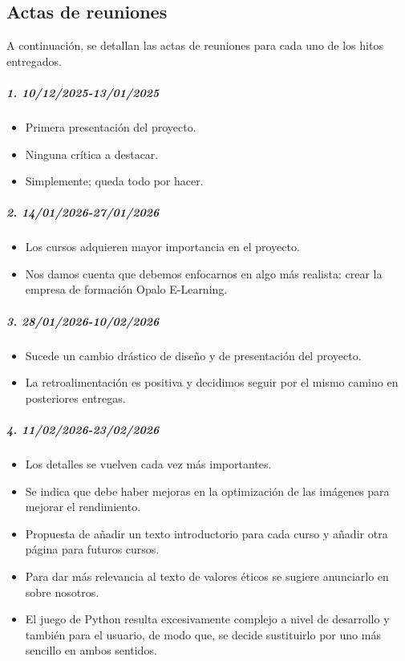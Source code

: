 \documentclass[11.5pt]{article}
\begin{document}
	
	
	\subsection{Actas de reuniones}
	
	A continuación, se detallan las actas de reuniones para cada uno de los hitos entregados.
	
	\subparagraph*{1. 10/12/2025-13/01/2025}
	
	\begin{itemize}
		\item Primera presentación del proyecto.
		\item Ninguna crítica a destacar.
		\item Simplemente; queda todo por hacer.
	\end{itemize}

	\subparagraph*{2. 14/01/2026-27/01/2026}
	
	\begin{itemize}
		\item Los cursos adquieren mayor importancia en el proyecto.
		\item Nos damos cuenta que debemos enfocarnos en algo más realista: crear la empresa de formación Opalo E-Learning.
	\end{itemize}
	
	\subparagraph*{3. 28/01/2026-10/02/2026}
	
	\begin{itemize}
		\item Sucede un cambio drástico de diseño y de presentación del proyecto.
		\item La retroalimentación es positiva y decidimos seguir por el mismo camino en posteriores entregas.
	\end{itemize}
	
	\subparagraph*{4. 11/02/2026-23/02/2026}
	
	\begin{itemize}
		\item Los detalles se vuelven cada vez más importantes.
		\item Se indica que debe haber mejoras en la optimización de las imágenes para mejorar el rendimiento.
		\item Propuesta de añadir un texto introductorio para cada curso y añadir otra página para futuros cursos.
		\item Para dar más relevancia al texto de valores éticos se sugiere anunciarlo en sobre nosotros.
		\item El juego de Python resulta excesivamente complejo a nivel de desarrollo y también para el usuario, de modo que, se decide sustituirlo por uno más sencillo en ambos sentidos.
	\end{itemize}
	
\end{document}
